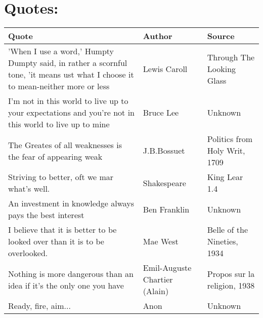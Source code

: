 \documentclass{article}
\begin{document}
\section*{Quotes:}
    \begin{tabularx}{0.8\textwidth} { 
  | >{\centering\arraybackslash}X 
  | >{\centering\arraybackslash}X 
  |  >{\centering\arraybackslash}X |}
    \hline
    
    Quote & Author & Source\\
    
    \hline
    
    'When I use a word,' Humpty Dumpty said, in rather a scornful tone, 'it means ust what I choose it to mean-neither more or less 
    & Lewis Caroll 
    & Through The Looking Glass \\
    
    \hline

    I'm not in this world to live up to your expectations and you're not in this world to live up to mine
    & Bruce Lee
    & Unknown\\

    \hline

    The Greates of all weaknesses is the fear of appearing weak 
    & J.B.Bossuet
    & Politics from Holy Writ, 1709\\

    \hline

    Striving to better, oft we mar what's well.
    & Shakespeare
    & King Lear 1.4\\

    \hline

    An investment in knowledge always pays the best interest
    & Ben Franklin
    & Unknown \\

    \hline

    I believe that it is better to be looked over than it is to be overlooked.
    & Mae West
    & Belle of the Nineties, 1934 \\

    \hline

    Nothing is more dangerous than an idea if it's the only one you have 
    & Emil-Auguste Chartier (Alain)
    & Propos sur la religion, 1938 \\

    \hline

    Ready, fire, aim...
    & Anon
    & Unknown \\

    \hline


\end{tabularx}
\end{document}
